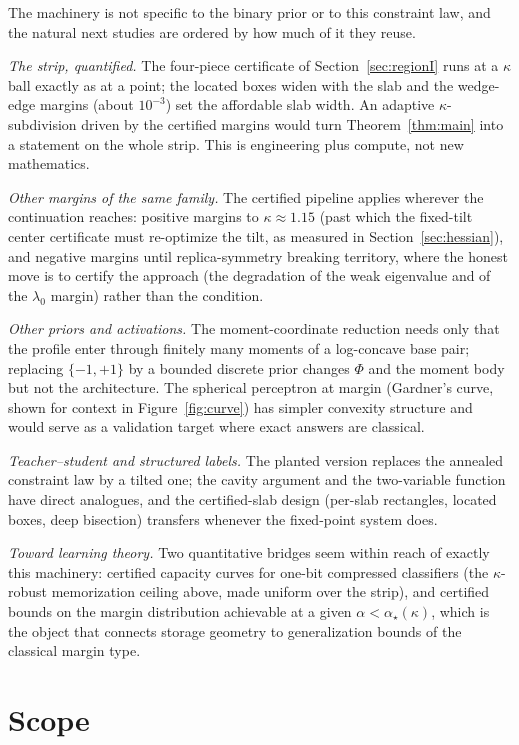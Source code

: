 \documentclass[11pt]{article}
\theoremstyle{remark}
\begin{document}
The machinery is not specific to the binary prior or to this
constraint law, and the natural next studies are ordered by how much
of it they reuse.

\emph{The strip, quantified.}  The four-piece certificate of
Section~\ref{sec:regionI} runs at a $\kappa$ ball exactly as at a
point; the located boxes widen with the slab and the wedge-edge
margins (about $10^{-3}$) set the affordable slab width.  An
adaptive $\kappa$-subdivision driven by the certified margins would
turn Theorem~\ref{thm:main} into a statement on the whole strip.
This is engineering plus compute, not new mathematics.

\emph{Other margins of the same family.}  The certified pipeline
applies wherever the continuation reaches: positive margins to
$\kappa\approx1.15$ (past which the fixed-tilt center certificate
must re-optimize the tilt, as measured in Section~\ref{sec:hessian}),
and negative margins until replica-symmetry breaking territory,
where the honest move is to certify the approach (the degradation of
the weak eigenvalue and of the $\lambda_0$ margin) rather than the
condition.

\emph{Other priors and activations.}  The moment-coordinate
reduction needs only that the profile enter through finitely many
moments of a log-concave base pair; replacing $\{-1,+1\}$ by a
bounded discrete prior changes $\Phi$ and the moment body but not
the architecture.  The spherical perceptron at margin (Gardner's
curve, shown for context in Figure~\ref{fig:curve}) has simpler
convexity structure and would serve as a validation target where
exact answers are classical.

\emph{Teacher--student and structured labels.}  The planted version
replaces the annealed constraint law by a tilted one; the cavity
argument and the two-variable function have direct analogues, and
the certified-slab design (per-slab rectangles, located boxes, deep
bisection) transfers whenever the fixed-point system does.

\emph{Toward learning theory.}  Two quantitative bridges seem
within reach of exactly this machinery: certified capacity curves
for one-bit compressed classifiers (the $\kappa$-robust memorization
ceiling above, made uniform over the strip), and certified bounds on
the margin distribution achievable at a given $\alpha<
\alpha_\star(\kappa)$, which is the object that connects storage
geometry to generalization bounds of the classical margin type.

\section{Scope}\label{sec:scope}
\end{document}
